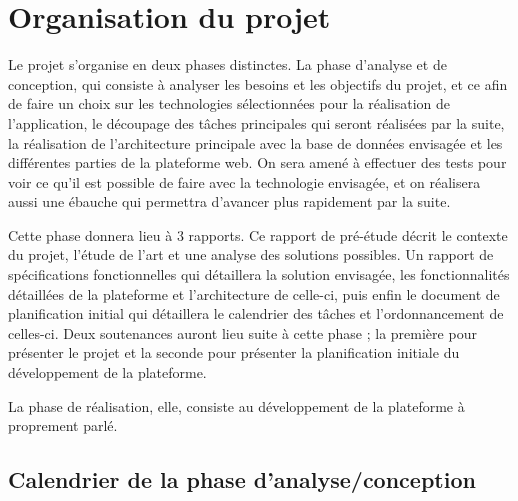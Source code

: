 \section{Organisation du projet}
\label{sec:organisation}
    Le projet s’organise en deux phases distinctes. La phase d’analyse et de conception, qui consiste
    à analyser les besoins et les objectifs du projet, et ce afin de faire un choix sur les technologies
    sélectionnées pour la réalisation de l’application, le découpage des tâches principales qui seront
    réalisées par la suite, la réalisation de l’architecture principale avec la base de données envisagée
    et les différentes parties de la plateforme web. On sera amené à effectuer des tests pour voir ce qu’il
    est possible de faire avec la technologie envisagée, et on réalisera aussi une ébauche qui permettra
    d’avancer plus rapidement par la suite.

    Cette phase donnera lieu à 3 rapports. Ce rapport de pré-étude décrit le contexte du projet,
    l’étude de l’art et une analyse des solutions possibles. Un rapport de spécifications fonctionnelles
    qui détaillera la solution envisagée, les fonctionnalités détaillées de la plateforme et l’architecture
    de celle-ci, puis enfin le document de planification initial qui détaillera le calendrier des tâches et
    l’ordonnancement de celles-ci. Deux soutenances auront lieu suite à cette phase ; la première pour présenter
    le projet et la seconde pour présenter la planification initiale du développement de la plateforme.

    La phase de réalisation, elle, consiste au développement de la plateforme à proprement parlé.

    \subsection{Calendrier de la phase d’analyse/conception}
    \label{subsec:calendrier}

